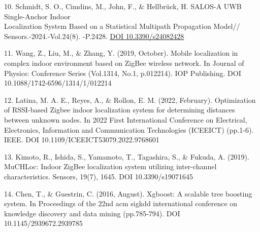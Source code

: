 \begin{references}
10. Schmidt, S. O., Cimdins, M., John, F., \& Hellbrück, H. SALOS-A UWB
Single-Anchor Indoor \\Localization System Based on a Statistical
Multipath Propagation Model// Sensors.-2024.-Vol.24(8). -P.2428.
\href{https://doi.org/10.3390/s24082428}{DOI 10.3390/s24082428}

11. Wang, Z., Liu, M., \& Zhang, Y. (2019, October). Mobile localization
in complex indoor environment based on ZigBee wireless network. In
Journal of Physics: Conference Series (Vol.1314, No.1, p.012214). IOP
Publishing. DOI 10.1088/1742-6596/1314/1/012214

12. Latina, M. A. E., Reyes, A., \& Rollon, E. M. (2022, February).
Optimization of RSSI-based Zigbee indoor localization system for
determining distances between unknown nodes. In 2022 First International
Conference on Electrical, Electronics, Information and Communication
Technologies (ICEEICT) (pp.1-6). IEEE. DOI
10.1109/ICEEICT53079.2022.9768601

13. Kimoto, R., Ishida, S., Yamamoto, T., Tagashira, S., \& Fukuda, A.
(2019). MuCHLoc: Indoor ZigBee localization system utilizing
inter-channel characteristics. Sensors, 19(7), 1645. DOI
10.3390/s19071645

14. Chen, T., \& Guestrin, C. (2016, August). Xgboost: A scalable tree
boosting system. In Proceedings of the 22nd acm sigkdd international
conference on knowledge discovery and data mining (pp.785-794). DOI
10.1145/2939672.2939785
\end{references}

